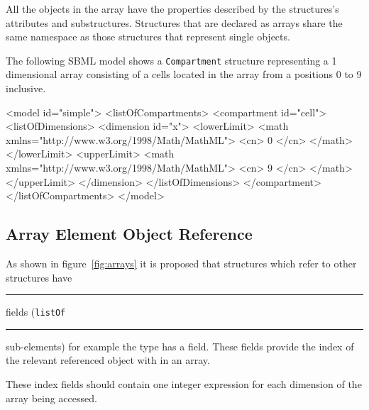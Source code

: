 \documentclass{cekarticle}
\begin{document}
All the objects in the
array have the properties described by the structures's
attributes and substructures.
Structures that are declared as arrays share the same namespace
as those structures that represent single objects.

The following SBML model shows a \texttt{Compartment}
structure representing a 1 dimensional array consisting of
a cells located in the array from a positions 0 to 9 inclusive.

\begin{example}
<model id="simple">
    <listOfCompartments>
        <compartment id="cell">
            <listOfDimensions>
                <dimension id="x">
                    <lowerLimit>
                        <math xmlns="http://www.w3.org/1998/Math/MathML">
                            <cn> 0 </cn>
                        </math>
                    </lowerLimit>
                    <upperLimit>
                        <math xmlns="http://www.w3.org/1998/Math/MathML">
                            <cn> 9 </cn>
                        </math>
                    </upperLimit>
                </dimension>
            </listOfDimensions>
        </compartment>
    </listOfCompartments>
</model>
\end{example}

\subsection{Array Element Object Reference}

As shown in figure~\ref{fig:arrays} it is proposed that structures
which refer to other structures have \rule{0.5in}{0.5pt} fields
(\texttt{listOf}\rule{0.5in}{0.5pt} sub-elements) for example the type 
has a  field.  These fields provide the index of
the relevant referenced object with in an array. 

These index fields should contain one integer expression for each dimension of the array being accessed.
\end{document}
